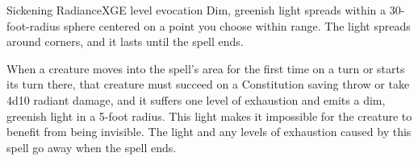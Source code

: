\begin{spell}{Sickening Radiance}{XGE}{ level evocation}
{
}
Dim, greenish light spreads within a 30-foot-radius sphere
centered on a point you choose within range. The light spreads
around corners, and it lasts until the spell ends.

When a creature moves into the spell's area for the first
time on a turn or starts its turn there, that creature must
succeed on a Constitution saving throw or take 4d10 radiant
damage, and it suffers one level of exhaustion and emits a dim,
greenish light in a 5-foot radius. This light makes it impossible
for the creature to benefit from being invisible. The light and
any levels of exhaustion caused by this spell go away when the
spell ends.
\end{spell}

